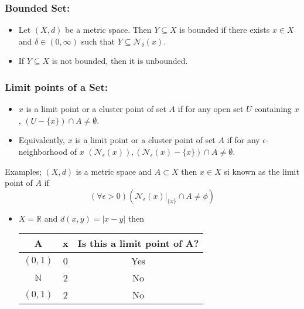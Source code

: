 \documentclass[12pt,a4paper]{article}
\begin{document}
 \subsubsection{Bounded Set:} 
\begin{itemize}
    \item Let \((X, d)\) be a metric space. Then \(Y \subseteq X\) is bounded if there exists \(x \in X\) and \(\delta \in(0, \infty)\) such that \(Y \subseteq \mathcal{N}_\delta(x)\).
    \item If \(Y \subseteq X\) is not bounded, then it is unbounded.
\end{itemize}

 \subsubsection{Limit points of a Set:} 
\begin{itemize}
    \item \(x\) is a limit point or a cluster point of set \(A\) if for any open set \(U\) containing \(x\), \((U-\{x\}) \cap A \neq \emptyset\).
    \item Equivalently, \(x\) is a limit point or a cluster point of set \(A\) if for any \(\epsilon\)-neighborhood of \(x\) \(\left(\mathcal{N}_\epsilon(x)\right),\left(\mathcal{N}_\epsilon(x)-\{x\}\right) \cap A \neq \emptyset\).
\end{itemize}
 
Examples;
\((X,d)\) is a metric space and \(A \subset X\) then \(x \in X\) si known as the limit point of \(A\) if 
    \begin{equation*}
        \left( \forall \epsilon > 0 \right)(\mathcal{N}_{\epsilon}(x)|_{\{x\}} \cap A \neq \phi) 
    \end{equation*}   
\begin{itemize}
    \item \(X = \mathbb{R}\) and \(d(x,y)=|x-y|\) then
    \begin{table}[htpb]
        \centering
        \begin{tabular}{|c|c|c|}
        \hline A & x & Is this a limit point of A?\\
        \hline \((0,1)\) & 0 & Yes \\
        \hline \(\mathbb{N}\) & 2 & No \\
        \hline \((0,1)\) & 2 & No \\
        \hline    
        \end{tabular}
    \end{table}         
\end{itemize}
\end{document}
